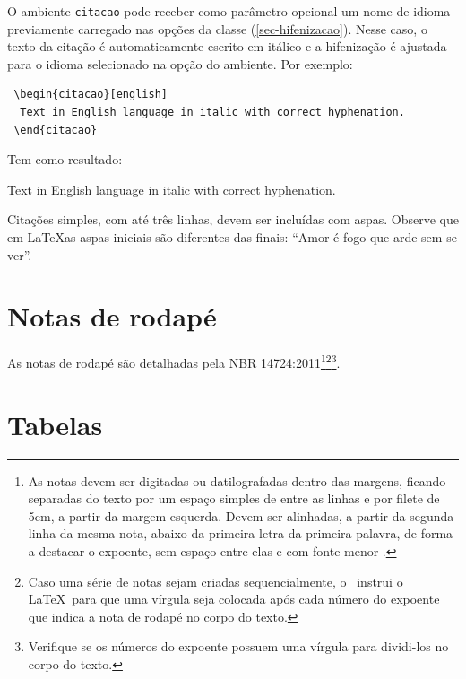 \documentclass[12pt,oneside,a4paper,chapter=TITLE,english,brazil]{abntex2}
\begin{document}
\begin{anexosenv}
O ambiente \texttt{citacao} pode receber como parâmetro opcional um nome de idioma previamente carregado nas opções da classe (\autoref{sec-hifenizacao}). Nesse caso, o texto da citação é automaticamente escrito em itálico e a hifenização é ajustada para o idioma selecionado na opção do ambiente. Por exemplo:
\begin{verbatim}
 \begin{citacao}[english]
  Text in English language in italic with correct hyphenation.
 \end{citacao}
\end{verbatim}

Tem como resultado:
\begin{citacao}[english]
Text in English language in italic with correct hyphenation.
\end{citacao}

Citações simples, com até três linhas, devem ser incluídas com aspas. Observe que em \LaTeX as aspas iniciais são diferentes das finais: ``Amor é fogo que arde sem se ver''.

\section{Notas de rodapé}

As notas de rodapé são detalhadas pela NBR 14724:2011\footnote{As notas devem ser digitadas ou datilografadas dentro das margens, ficando separadas do texto por um espaço simples de entre as linhas e por filete de 5cm, a partir da margem esquerda. Devem ser alinhadas, a partir da segunda linha da mesma nota, abaixo da primeira letra da primeira palavra, de forma a destacar o expoente, sem espaço entre elas e com fonte menor .}\footnote{Caso uma série de notas sejam criadas sequencialmente, o \abnTeX\ instrui o \LaTeX\ para que uma vírgula seja colocada após cada número do expoente que indica a nota de rodapé no corpo do texto.}\footnote{Verifique se os números do expoente possuem uma vírgula para dividi-los no corpo do texto.}. 

\section{Tabelas}


\end{anexosenv}
\end{document}
